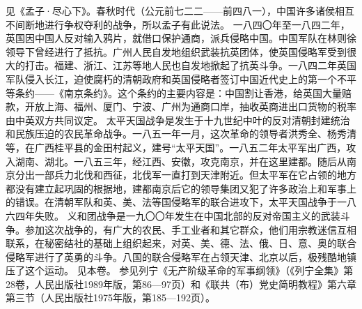 \begin{maonote}
见《孟子·尽心下》。春秋时代（公元前七二二——前四八一），中国许多诸侯相互不间断地进行争权夺利的战争，所以孟子有此说法。
一八四〇年至一八四二年，英国因中国人反对输入鸦片，就借口保护通商，派兵侵略中国。中国军队在林则徐领导下曾经进行了抵抗。广州人民自发地组织武装抗英团体，使英国侵略军受到很大的打击。福建、浙江、江苏等地人民也自发地掀起了抗英斗争。一八四二年英国军队侵入长江，迫使腐朽的清朝政府和英国侵略者签订中国近代史上的第一个不平等条约——《南京条约》。这个条约的主要内容是：中国割让香港，给英国大量赔款，开放上海、福州、厦门、宁波、广州为通商口岸，抽收英商进出口货物的税率由中英双方共同议定。
太平天国战争是发生于十九世纪中叶的反对清朝封建统治和民族压迫的农民革命战争。一八五一年一月，这次革命的领导者洪秀全、杨秀清等，在广西桂平县的金田村起义，建号“太平天国”。一八五二年太平军出广西，攻入湖南、湖北。一八五三年，经江西、安徽，攻克南京，并在这里建都。随后从南京分出一部兵力北伐和西征，北伐军一直打到天津附近。但太平军在它占领的地方都没有建立起巩固的根据地，建都南京后它的领导集团又犯了许多政治上和军事上的错误。在清朝军队和英、美、法等国侵略军的联合进攻下，太平天国战争于一八六四年失败。
义和团战争是一九〇〇年发生在中国北部的反对帝国主义的武装斗争。参加这次战争的，有广大的农民、手工业者和其它群众，他们用宗教迷信互相联系，在秘密结社的基础上组织起来，对英、美、德、法、俄、日、意、奥的联合侵略军进行了英勇的斗争。八国的联合侵略军在占领天津、北京以后，极残酷地镇压了这个运动。
见本卷。
参见列宁《无产阶级革命的军事纲领》（《列宁全集》第28卷，人民出版社1989年版，第86—97页）和《联共（布）党史简明教程》第六章第三节（人民出版社1975年版，第185—192页）。
\end{maonote}
